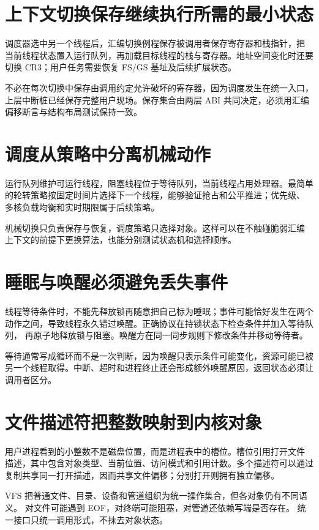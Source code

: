 \section{上下文切换保存继续执行所需的最小状态}

调度器选中另一个线程后，汇编切换例程保存被调用者保存寄存器和栈指针，把
当前线程状态置入运行队列，再加载目标线程的栈与寄存器。地址空间变化时还要
切换 CR3；用户任务需要恢复 FS/GS 基址及后续扩展状态。

不必在每次切换中保存由调用约定允许破坏的寄存器，因为调度发生在统一入口，
上层中断桩已经保存完整用户现场。保存集合由两层 ABI 共同决定，必须用汇编
偏移断言与结构布局测试保持一致。

\section{调度从策略中分离机械动作}

运行队列维护可运行线程，阻塞线程位于等待队列，当前线程占用处理器。最简单
的轮转策略按固定时间片选择下一个线程，能够验证抢占和公平推进；优先级、
多核负载均衡和实时期限属于后续策略。

机械切换只负责保存与恢复，调度策略只选择对象。这样可以在不触碰脆弱汇编
上下文的前提下更换算法，也能分别测试状态机和选择顺序。

\section{睡眠与唤醒必须避免丢失事件}

线程等待条件时，不能先释放锁再随意把自己标为睡眠；事件可能恰好发生在两个
动作之间，导致线程永久错过唤醒。正确协议在持锁状态下检查条件并加入等待队列，
再原子地释放锁与阻塞。唤醒方在同一同步规则下修改条件并移动等待者。

等待通常写成循环而不是一次判断，因为唤醒只表示条件可能变化，资源可能已被
另一个线程取得。中断、超时和进程终止还会形成额外唤醒原因，返回状态必须让
调用者区分。

\section{文件描述符把整数映射到内核对象}

用户进程看到的小整数不是磁盘位置，而是进程表中的槽位。槽位引用打开文件
描述，其中包含对象类型、当前位置、访问模式和引用计数。多个描述符可以通过
复制共享同一打开描述，因而共享文件偏移；分别打开则拥有独立偏移。

VFS 把普通文件、目录、设备和管道组织为统一操作集合，但各对象仍有不同语义。
 对文件可能遇到 EOF，对终端可能阻塞，对管道还依赖写端是否存在。
统一接口只统一调用形式，不抹去对象状态。

